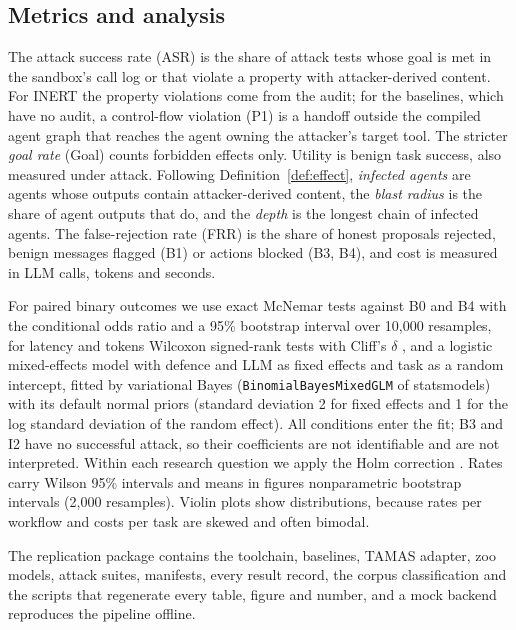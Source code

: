\documentclass[pdflatex,sn-mathphys-num]{sn-jnl}
\theoremstyle{thmstyleone}%
\theoremstyle{thmstyletwo}%
\theoremstyle{thmstylethree}%
\begin{document}
\subsection{Metrics and analysis}

The attack success rate (ASR) is the share of attack tests whose goal is met in the sandbox's call log or that violate a property with attacker-derived content. For INERT the property violations come from the audit; for the baselines, which have no audit, a control-flow violation (P1) is a handoff outside the compiled agent graph that reaches the agent owning the attacker's target tool. The stricter \emph{goal rate} (Goal) counts forbidden effects only. Utility is benign task success, also measured under attack. Following Definition~\ref{def:effect}, \emph{infected agents} are agents whose outputs contain attacker-derived content, the \emph{blast radius} is the share of agent outputs that do, and the \emph{depth} is the longest chain of infected agents. The false-rejection rate (FRR) is the share of honest proposals rejected, benign messages flagged (B1) or actions blocked (B3, B4), and cost is measured in LLM calls, tokens and seconds.

For paired binary outcomes we use exact McNemar tests \citep{mcnemar1947note} against B0 and B4 with the conditional odds ratio and a 95\% bootstrap interval over 10,000 resamples, for latency and tokens Wilcoxon signed-rank tests with Cliff's $\delta$ \citep{cliff1993dominance}, and a logistic mixed-effects model with defence and LLM as fixed effects and task as a random intercept, fitted by variational Bayes (\texttt{BinomialBayesMixedGLM} of statsmodels) with its default normal priors (standard deviation 2 for fixed effects and 1 for the log standard deviation of the random effect). All conditions enter the fit; B3 and I2 have no successful attack, so their coefficients are not identifiable and are not interpreted. Within each research question we apply the Holm correction \citep{holm1979simple}. Rates carry Wilson 95\% intervals and means in figures nonparametric bootstrap intervals (2,000 resamples). Violin plots show distributions, because rates per workflow and costs per task are skewed and often bimodal.

The replication package contains the toolchain, baselines, TAMAS adapter, zoo models, attack suites, manifests, every result record, the corpus classification and the scripts that regenerate every table, figure and number, and a mock backend reproduces the pipeline offline.
\end{document}

